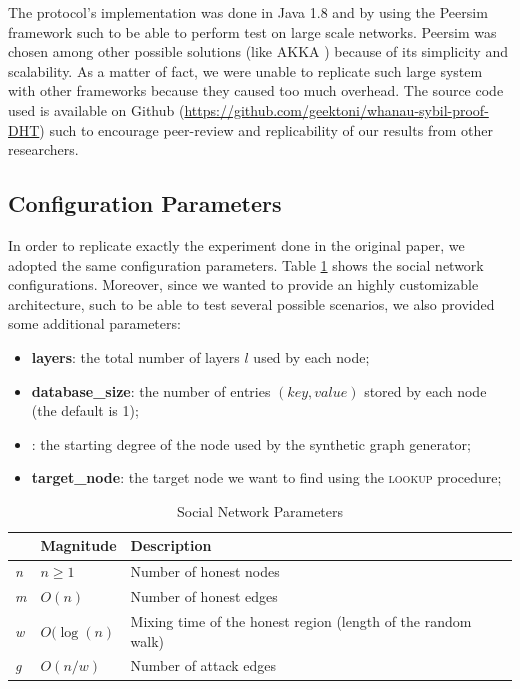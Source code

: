The protocol's implementation was done in Java 1.8 and by using the Peersim framework such to be able to perform test on large scale networks. Peersim was chosen among other possible solutions (like AKKA \cite{thurau2012akka}) because of its simplicity and scalability. As a matter of fact, we were unable to replicate such large system with other frameworks because they caused too much overhead.
The source code used is available on Github (\href{https://github.com/geektoni/whanau-sybil-proof-DHT}{https://github.com/geektoni/whanau-sybil-proof-DHT}) such to encourage peer-review and replicability of our results from other researchers.

\subsection{Configuration Parameters}

In order to replicate exactly the experiment done in the original paper, we adopted the same configuration parameters. Table \ref{table:social_network} shows the social network configurations.
Moreover, since we wanted to provide an highly customizable architecture, such to be able to test several possible scenarios, we also provided some additional parameters:
\begin{itemize}
    \item \textbf{layers}: the total number of layers $l$ used by each node;
    \item \textbf{database\_size}: the number of entries $(key,value)$ stored by each node (the default is 1);
    \item {}: the starting degree of the node used by the synthetic graph generator;
    \item \textbf{target\_node}: the target node we want to find using the \textsc{lookup} procedure;
\end{itemize}

\begin{table}[h]
\centering
\caption{Social Network Parameters}
\label{table:social_network}
\begin{tabular}{|l|l|p{5cm}|}
\hline
           & \textbf{Magnitude} & \textbf{Description}                                         \\ \hline
\textit{n} & $n \geq 1$         & Number of honest nodes                                       \\ \hline
\textit{m} & $O(n)$             & Number of honest edges                                       \\ \hline
\textit{w} & $O(\log(n)$        & Mixing time of the honest region (length of the random walk) \\ \hline
\textit{g} & $O(n/w)$   & Number of attack edges                                       \\ \hline
\end{tabular}
\end{table}

